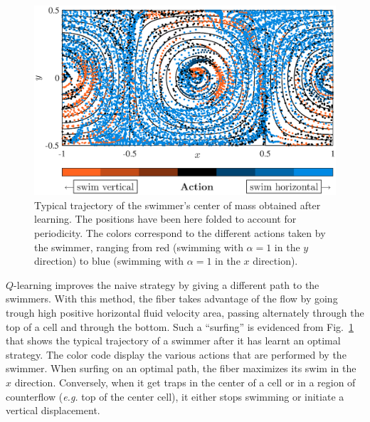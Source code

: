 \documentclass[aps,prl,preprint,groupedaddress]{revtex4-2}
\begin{document}
\begin{figure}[ht]
  \centerline{\includegraphics[width=\columnwidth]{traj_centerofmass}}
  \caption{\label{fig:traj_centerofmass} Typical trajectory of the swimmer's center of mass obtained after learning. The positions have been here folded to account for periodicity. The colors correspond to the different actions taken by the swimmer, ranging from red (swimming with $\alpha = 1$ in the $y$ direction) to blue (swimming with $\alpha = 1$ in the $x$ direction).}
\end{figure}
$Q$-learning improves the naive strategy by giving a different path to the swimmers. With this method, the fiber takes advantage of the flow by going trough high positive horizontal fluid velocity area, passing alternately through the top of a cell and through the bottom. Such a ``surfing'' is evidenced from Fig.~\ref{fig:traj_centerofmass} that shows the typical trajectory of a swimmer after it has learnt an optimal strategy. The color code display the various actions that are performed by the swimmer. When surfing on an optimal path, the fiber maximizes its swim in the $x$ direction. Conversely, when it get traps in the center of a cell or in a region of counterflow (\textit{e.g.} top of the center cell), it either stops swimming or initiate a vertical displacement.
\end{document}
